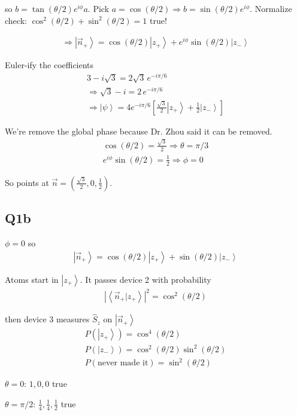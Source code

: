 \documentclass[
]{article}
\providecommand{\ket}[1]{\left\lvert #1 \right\rangle}
\providecommand{\braket}[1]{\left\langle #1 \right\rangle}
\providecommand{\Rarr}{\Rightarrow}
\begin{document}
so \(b=\tan(\theta/2)e^{i\phi}a\). Pick \(a=\cos(\theta/2)\Rarr b=\sin(\theta/2)e^{i\phi}\).
Normalize check: \(\cos^2(\theta/2)+\sin^2(\theta/2)=1\) true!

\begin{gather*}
	\Rarr\ket{\vec{n}_+}=\cos(\theta/2)\ket{z_+}+e^{i\phi}\sin(\theta/2)\ket{z_-}
\end{gather*}

Euler-ify the coefficients
\begin{gather*}
	3-i\sqrt{3}=2\sqrt{3}\,e^{-i\pi/6}\\
	\Rarr\sqrt{3}-i=2\,e^{-i\pi/6}\\
	\Rarr\ket{\psi}=4e^{-i\pi/6}\left[\tfrac{\sqrt{3}}{2}\ket{z_+}+\tfrac{1}{2}\ket{z_-}\right]
\end{gather*}

We're remove the global phase because Dr. Zhou said it can be removed.
\begin{gather*}
	\cos(\theta/2)=\tfrac{\sqrt{3}}{2}\Rarr \theta=\pi/3\\
	e^{i\phi}\sin(\theta/2)=\tfrac{1}{2}\Rarr \phi=0
\end{gather*}

So points at \(\vec{n}=\left(\tfrac{\sqrt{3}}{2},0,\tfrac{1}{2}\right)\).

\subsection{Q1b}

\(\phi=0\) so
\begin{gather*}
	\ket{\vec{n}_+}=\cos(\theta/2)\ket{z_+}+\sin(\theta/2)\ket{z_-}
\end{gather*}

Atoms start in \(\ket{z_+}\). It passes device 2 with probability
\begin{gather*}
	|\braket{\vec{n}_+|z_+}|^2=\cos^2(\theta/2)
\end{gather*}

then device 3 measures \(\hat{S}_z\) on \(\ket{\vec{n}_+}\)
\begin{gather*}
	P(\ket{z_+})=\cos^4(\theta/2)\\
	P(\ket{z_-})=\cos^2(\theta/2)\sin^2(\theta/2)\\
	P(\text{never made it})=\sin^2(\theta/2)
\end{gather*}

\(\theta=0\): \(1,0,0\) true

\(\theta=\pi/2\): \(\tfrac{1}{4},\tfrac{1}{4},\tfrac{1}{2}\) true
\end{document}
